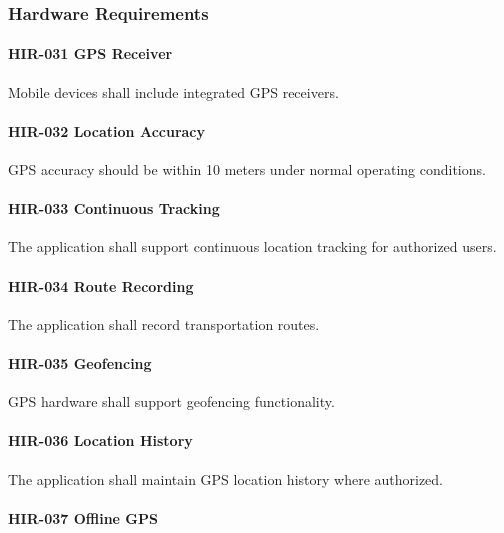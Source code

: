 
\subsubsection*{Hardware Requirements}

\paragraph{HIR-031 GPS Receiver}

Mobile devices shall include integrated GPS receivers.

\paragraph{HIR-032 Location Accuracy}

GPS accuracy should be within 10 meters under normal operating
conditions.

\paragraph{HIR-033 Continuous Tracking}

The application shall support continuous location tracking for
authorized users.

\paragraph{HIR-034 Route Recording}

The application shall record transportation routes.

\paragraph{HIR-035 Geofencing}

GPS hardware shall support geofencing functionality.

\paragraph{HIR-036 Location History}

The application shall maintain GPS location history where authorized.

\paragraph{HIR-037 Offline GPS}

